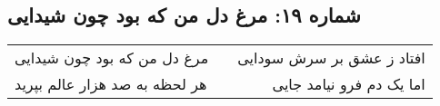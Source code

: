 \begin{center}
\section*{شماره ۱۹: مرغ دل من که بود چون شیدایی}
\label{sec:019}
\begin{longtable}{l p{0.5cm} r}
مرغ دل من که بود چون شیدایی
&&
افتاد ز عشق بر سرش سودایی
\\
هر لحظه به صد هزار عالم بپرید
&&
اما یک دم فرو نیامد جایی
\\
\end{longtable}
\end{center}
